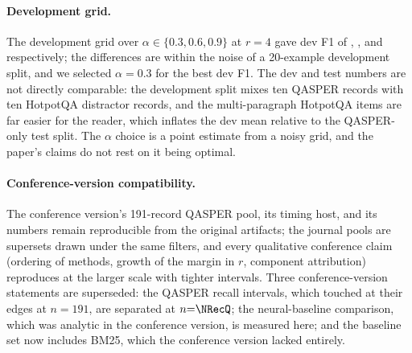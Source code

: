 \documentclass[preprint,12pt]{elsarticle}
\theoremstyle{remark}
\begin{document}
\paragraph{Development grid.}
The development grid over $\alpha \in \{0.3, 0.6, 0.9\}$ at $r=4$
gave dev F1 of \GridALo, \GridAMid, and \GridAHi{} respectively; the
differences are within the noise of a 20-example development split,
and we selected $\alpha=0.3$ for the best dev F1. The dev and test
numbers are not directly comparable: the development split mixes ten
QASPER records with ten HotpotQA distractor records, and the
multi-paragraph HotpotQA items are far easier for the reader, which
inflates the dev mean relative to the QASPER-only test split. The
$\alpha$ choice is a point estimate from a noisy grid, and the
paper's claims do not rest on it being optimal.

\paragraph{Conference-version compatibility.}
The conference version's 191-record QASPER pool, its timing host, and
its numbers remain reproducible from the original artifacts; the
journal pools are supersets drawn under the same filters, and every
qualitative conference claim (ordering of methods, growth of the
margin in $r$, component attribution) reproduces at the larger scale
with tighter intervals. Three conference-version statements are
superseded: the QASPER recall intervals, which touched at their edges
at $n=191$, are separated at $n{=}\NRecQ$; the neural-baseline
comparison, which was analytic in the conference version, is measured
here; and the baseline set now includes BM25, which the conference
version lacked entirely.
\end{document}
